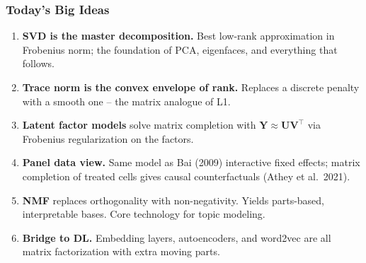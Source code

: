 \documentclass[notes,11pt, aspectratio=169]{beamer}
\newcommand{\vU}{\mathbf{U}}
\newcommand{\vV}{\mathbf{V}}
\newcommand{\vY}{\mathbf{Y}}
\begin{document}
\begin{frame}
\frametitle{Today's Big Ideas}

\begin{enumerate}
    \item \textbf{SVD is the master decomposition.} Best low-rank approximation in Frobenius norm; the foundation of PCA, eigenfaces, and everything that follows.

    \vspace{4pt}
    \item \textbf{Trace norm is the convex envelope of rank.} Replaces a discrete penalty with a smooth one -- the matrix analogue of L1.

    \vspace{4pt}
    \item \textbf{Latent factor models} solve matrix completion with $\vY \approx \vU \vV^\top$ via Frobenius regularization on the factors.

    \vspace{4pt}
    \item \textbf{Panel data view.} Same model as Bai (2009) interactive fixed effects; matrix completion of treated cells gives causal counterfactuals (Athey et al.\ 2021).

    \vspace{4pt}
    \item \textbf{NMF} replaces orthogonality with non-negativity. Yields parts-based, interpretable bases. Core technology for topic modeling.

    \vspace{4pt}
    \item \textbf{Bridge to DL.} Embedding layers, autoencoders, and word2vec are all matrix factorization with extra moving parts.
\end{enumerate}
\end{frame}
\end{document}
